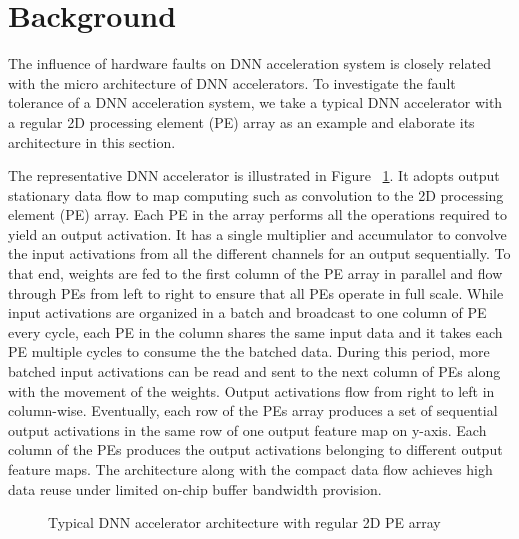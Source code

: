 \section{Background}\label{sec:background}
The influence of hardware faults on DNN acceleration system is closely related with 
the micro architecture of DNN accelerators. To investigate the fault tolerance 
of a DNN acceleration system, we take a typical DNN accelerator with a regular 
2D processing element (PE) array as an example and elaborate its architecture 
in this section.

The representative DNN accelerator is illustrated in 
Figure ~\ref{fig:npu-arch}. It adopts output stationary data flow 
to map computing such as convolution to the 2D processing element (PE) array. 
Each PE in the array performs all the operations required to yield 
an output activation. It has a single multiplier and accumulator 
to convolve the input activations from all the different channels 
for an output sequentially. To that end, weights 
are fed to the first column of the PE array in parallel and flow 
through PEs from left to right to ensure that all PEs operate in full 
scale. While input activations are organized in a batch and broadcast 
to one column of PE every cycle, each PE in the column shares the 
same input data and it takes each PE multiple cycles to consume the 
the batched data. During this period, more batched input activations 
can be read and sent to the next column of PEs along with 
the movement of the weights. Output activations flow 
from right to left in column-wise. Eventually, each row of the PEs
array produces a set of sequential output activations in 
the same row of one output feature map on y-axis. 
Each column of the PEs produces the output activations 
belonging to different output feature maps. 
The architecture along with the compact data flow achieves 
high data reuse under limited on-chip buffer bandwidth provision. 

\begin{figure}
    \caption{Typical DNN accelerator architecture with regular 2D PE array}
\vspace{-0.5em}
\label{fig:npu-arch}
\end{figure}

